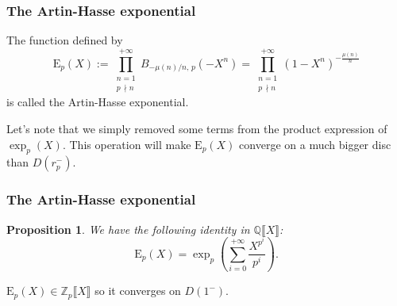 \documentclass{beamer}
\newcommand{\Z}{ \mathbb{Z} }
\newcommand{\Q}{ \mathbb{Q} }
\newcommand{\E}{ \mathrm{E} } %
\newcommand{\Zp}{ \Z_p }
\newcommand{\ser}[1]{ \llbracket {#1} \rrbracket } %
\theoremstyle{plain}
\newtheorem{prop}{Proposition}
\begin{document}
	\begin{frame}
		\frametitle{The Artin-Hasse exponential}
		\begin{definition}
			The function defined by
			\[
				\E_p(X) := \prod_{\substack{n = 1 \\ p\, \nmid n}}^{+\infty} B_{-\mu(n)/n,\,p}(-X^n) =  \prod_{\substack{n = 1 \\ p\, \nmid n}}^{+\infty} (1 - X^n)^{-\frac{\mu(n)}{n}}
			\]
			is called the \alert{Artin-Hasse exponential}.
		\end{definition}
		Let's note that we simply removed some terms from the product expression of $\exp_p(X)$. This operation will make $\E_p(X)$ converge on a much bigger disc than $D(r_p^-)$.
	\end{frame}
	\begin{frame}
		\frametitle{The Artin-Hasse exponential}
		\begin{prop}
			We have the following identity in $\Q\ser{X}$:
			\[
				\E_p(X) = \exp_p\left(\sum_{i=0}^{+\infty} \frac{X^{p^i}}{p^i}\right).
			\]
		\end{prop}
		\pause
		\begin{theorem}
			$\E_p(X) \in \Zp\ser{X}$ so it converges on $D(1^-)$.
		\end{theorem}
	\end{frame}
	
\end{document}
